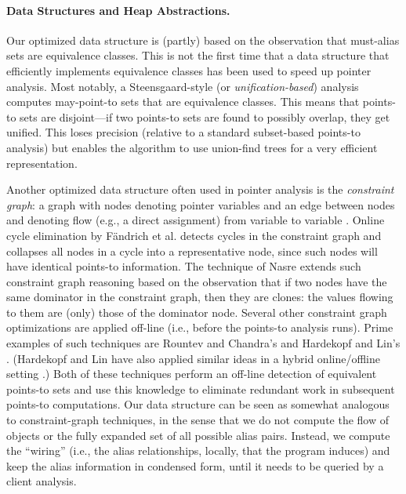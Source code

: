 \paragraph{Data Structures and Heap Abstractions.}
Our optimized data structure is (partly) based on the observation that
must-alias sets are equivalence classes. This is not the first time
that a data structure that efficiently implements equivalence classes
has been used to speed up pointer analysis. Most notably, a
Steensgaard-style (or \emph{unification-based})
\cite{popl:1996:Steensgaard} analysis computes may-point-to sets
that are equivalence classes. This means that points-to sets are
disjoint---if two points-to sets are found to possibly overlap, they
get unified. This loses precision (relative to a standard subset-based
points-to analysis) but enables the algorithm to use union-find trees
for a very efficient representation.

Another optimized data structure often used in pointer analysis is the
\emph{constraint graph}: a graph with nodes denoting pointer variables
and an edge between nodes  and  denoting flow (e.g., a
direct assignment) from variable  to variable .  Online
cycle elimination by F\"{a}ndrich et al.
\cite{pldi:1998:Fahndrich} detects cycles in the
constraint graph and collapses all nodes in a cycle into a
representative node, since such nodes will have identical points-to
information. The technique of Nasre
\cite{ismm:2012:Nasre} extends such constraint graph
reasoning based on the observation that if two nodes have the same
dominator in the constraint graph, then they are clones: the values
flowing to them are (only) those of the dominator node. Several other
constraint graph optimizations are applied off-line (i.e., before the
points-to analysis runs).  Prime examples of such techniques are
Rountev and Chandra's \cite{pldi:2000:Rountev} and Hardekopf and Lin's
\cite{sas:2007:Hardekopf}. (Hardekopf and Lin have also applied similar
ideas in a hybrid online/offline setting \cite{pldi:2007:Hardekopf}.)  Both
of these techniques perform an off-line detection of equivalent
points-to sets and use this knowledge to eliminate redundant work in
subsequent points-to computations. Our data structure can be seen as
somewhat analogous to constraint-graph techniques, in the sense that
we do not compute the flow of objects or the fully expanded set of all
possible alias pairs. Instead, we compute the ``wiring'' (i.e., the
alias relationships, locally, that the program induces) and keep the
alias information in condensed form, until it needs to be queried by a
client analysis.

